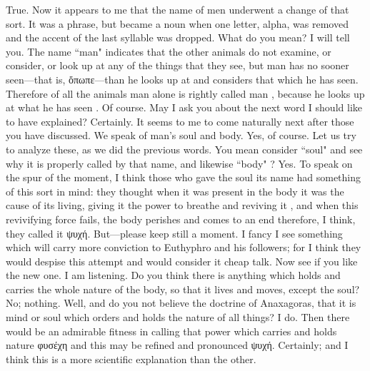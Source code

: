 \hermogenesspeaks
True.
\socratesspeaks
Now it appears to me that the name of men  underwent a change of that sort. It was a phrase, but became a noun when one letter, alpha, was removed and the accent of the last syllable was dropped.
\hermogenesspeaks
What do you mean? 
\socratesspeaks
I will tell you. The name ``man"  indicates that the other animals do not examine, or consider, or look up at  any of the things that they see, but man has no sooner seen—that is, ὄπωπε—than he looks up at and considers that which he has seen. Therefore of all the animals man alone is rightly called man , because he looks up at  what he has seen .
\hermogenesspeaks
Of course. May I ask you about the next word I should like to have explained?
\socratesspeaks
Certainly. 
\hermogenesspeaks
It seems to me to come naturally next after those you have discussed. We speak of man's soul and body.
\socratesspeaks
Yes, of course.
\hermogenesspeaks
Let us try to analyze these, as we did the previous words.
\socratesspeaks
You mean consider ``soul"  and see why it is properly called by that name, and likewise ``body" ?
\hermogenesspeaks
Yes.
\socratesspeaks
To speak on the spur of the moment, I think those who gave the soul its name had something of this sort in mind: they thought when it was present in the body it was the cause of its living,  giving it the power to breathe and reviving it , and when this revivifying force fails, the body perishes and comes to an end therefore, I think, they called it ψυχή. But—please keep still a moment. I fancy I see something which will carry more conviction  to Euthyphro and his followers; for I think they would despise this attempt and would consider it cheap talk. Now see if you like the new one.
\hermogenesspeaks
I am listening.
\socratesspeaks
Do you think there is anything which holds and carries the whole nature of the body, so that it lives and moves, except the soul?
\hermogenesspeaks
No; nothing.
\socratesspeaks
Well, and do you not believe the doctrine of Anaxagoras, that it is mind or soul which orders and holds the nature of all things?
\hermogenesspeaks
I do. 
\socratesspeaks
Then there would be an admirable fitness in calling that power which carries and holds  nature  φυσέχη and this may be refined and pronounced ψυχή.
\hermogenesspeaks
Certainly; and I think this is a more scientific explanation than the other.
